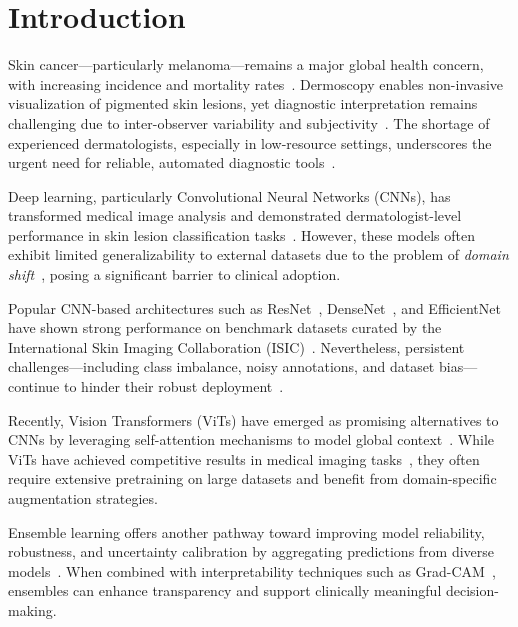 \documentclass[pdflatex,sn-mathphys-num]{sn-jnl}%
\theoremstyle{thmstyleone}%
\theoremstyle{thmstyletwo}%
\theoremstyle{thmstylethree}%
\begin{document}
\maketitle

\section{Introduction}\label{sec1}

Skin cancer—particularly melanoma—remains a major global health concern, with increasing incidence and mortality rates~\cite{guy2015vital, siegel2024cancer}. Dermoscopy enables non-invasive visualization of pigmented skin lesions, yet diagnostic interpretation remains challenging due to inter-observer variability and subjectivity~\cite{marghoob2012atlas}. The shortage of experienced dermatologists, especially in low-resource settings, underscores the urgent need for reliable, automated diagnostic tools~\cite{liopyris2022artificial}.

Deep learning, particularly Convolutional Neural Networks (CNNs), has transformed medical image analysis and demonstrated dermatologist-level performance in skin lesion classification tasks~\cite{litjens2017survey, esteva2017dermatologist}. However, these models often exhibit limited generalizability to external datasets due to the problem of \textit{domain shift}~\cite{tschandl2020human}, posing a significant barrier to clinical adoption.

Popular CNN-based architectures such as ResNet~\cite{he2016deep}, DenseNet~\cite{huang2017densely}, and EfficientNet~\cite{tan2019efficientnet} have shown strong performance on benchmark datasets curated by the International Skin Imaging Collaboration (ISIC)~\cite{tschandl2020human, rotemberg2021patient}. Nevertheless, persistent challenges—including class imbalance, noisy annotations, and dataset bias—continue to hinder their robust deployment~\cite{winkler2019association}.

Recently, Vision Transformers (ViTs) have emerged as promising alternatives to CNNs by leveraging self-attention mechanisms to model global context~\cite{dosovitskiy2020image, graham2021levit, he2023transformers}. While ViTs have achieved competitive results in medical imaging tasks~\cite{shamshad2023transformers}, they often require extensive pretraining on large datasets and benefit from domain-specific augmentation strategies.

Ensemble learning offers another pathway toward improving model reliability, robustness, and uncertainty calibration by aggregating predictions from diverse models~\cite{wolpert1992stacked, lakshminarayanan2017simple}. When combined with interpretability techniques such as Grad-CAM~\cite{xie2018multi, efat2024multi}, ensembles can enhance transparency and support clinically meaningful decision-making.
\end{document}
